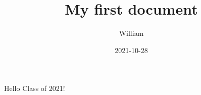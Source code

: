 \documentclass{article}
\title{My first document}
\date{2021-10-28}
\author{William}
\begin{document}
	\maketitle
	\newpage
	Hello Class of 2021!
\end{document}
